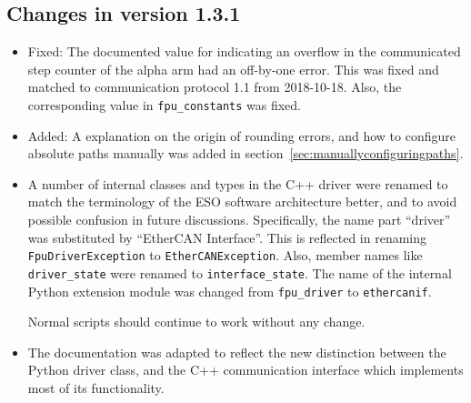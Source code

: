 \documentclass[11pt,a4paper]{scrartcl}
\begin{document}
\subsection*{Changes in version 1.3.1}
\begin{itemize}
\item Fixed: The documented value for indicating an overflow in the
  communicated step counter of the alpha arm had an off-by-one error.
  This was fixed and matched to communication protocol 1.1 from
  2018-10-18. Also, the corresponding value in \texttt{fpu\_constants}
  was fixed.
\item Added: A explanation on the origin of rounding errors, and how
  to configure absolute paths manually was added in
  section~\ref{sec:manuallyconfiguringpaths}.
  
\item A number of internal classes and types in the C++ driver were
  renamed to match the terminology of the ESO software architecture
  better, and to avoid possible confusion in future
  discussions. Specifically, the name part ``driver'' was substituted
  by ``EtherCAN Interface''.  This is reflected in renaming
  \texttt{FpuDriverException} to \texttt{EtherCANException}. Also,
  member names like \texttt{driver\_state} were renamed to
  \texttt{interface\_state}. The name of the internal Python extension
  module was changed from \texttt{fpu\_driver} to \texttt{ethercanif}.

  Normal scripts should continue to work without any change.
  

\item The documentation was adapted to reflect the new distinction
  between the Python driver class, and the C++ communication interface
  which implements most of its functionality.
\end{itemize}
\end{document}

